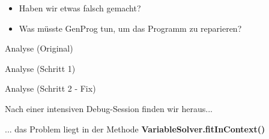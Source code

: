 %
\begin{frame}{}
	\begin{itemize}
		\item Haben wir etwas falsch gemacht?
		\item Was müsste GenProg tun, um das Programm zu reparieren?
	\end{itemize}
\end{frame}
%
\begin{frame}{Analyse (Original)}
	\begin{figure}
		\centering
	\end{figure}
\end{frame}
%
\begin{frame}{Analyse (Schritt 1)}
	\begin{figure}
		\centering
	\end{figure}
\end{frame}
%
\begin{frame}{Analyse (Schritt 2 - Fix)}
	\begin{figure}
		\centering
	\end{figure}
\end{frame}
%
\begin{frame}{}
	\begin{itemizes}{1em}
		\item Nach einer intensiven Debug-Session finden wir heraus...
		\item ... das Problem liegt in der Methode \textbf{VariableSolver.fitInContext()}
	\end{itemizes}
\end{frame}
%

